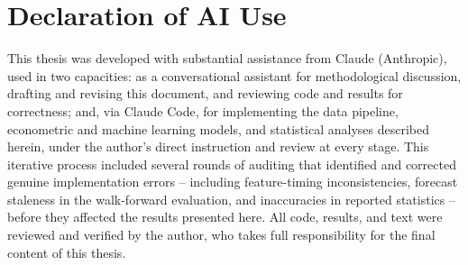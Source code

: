 \documentclass[12pt,a4paper]{article}
\begin{document}
\section*{Declaration of AI Use}
This thesis was developed with substantial assistance from Claude (Anthropic), used in two
capacities: as a conversational assistant for methodological discussion, drafting and revising
this document, and reviewing code and results for correctness; and, via Claude Code, for
implementing the data pipeline, econometric and machine learning models, and statistical
analyses described herein, under the author's direct instruction and review at every stage. This
iterative process included several rounds of auditing that identified and corrected genuine
implementation errors -- including feature-timing inconsistencies, forecast staleness in the
walk-forward evaluation, and inaccuracies in reported statistics -- before they affected the
results presented here. All code, results, and text were reviewed and verified by the author, who
takes full responsibility for the final content of this thesis.



\end{document}
